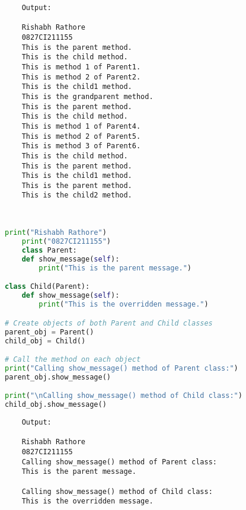 \documentclass{report}
\begin{document}
\begin{verbatim}
	Output:

	Rishabh Rathore
	0827CI211155
	This is the parent method.
	This is the child method.
	This is method 1 of Parent1.
	This is method 2 of Parent2.
	This is the child1 method.
	This is the grandparent method.
	This is the parent method.
	This is the child method.
	This is method 1 of Parent4.
	This is method 2 of Parent5.
	This is method 3 of Parent6.
	This is the child method.
	This is the parent method.
	This is the child1 method.
	This is the parent method.
	This is the child2 method.

	

\end{verbatim}

\newpage



\sol 
\begin{lstlisting}[language=Python]
	print("Rishabh Rathore")
	print("0827CI211155")
	class Parent:
    def show_message(self):
        print("This is the parent message.")

class Child(Parent):
    def show_message(self):
        print("This is the overridden message.")

# Create objects of both Parent and Child classes
parent_obj = Parent()
child_obj = Child()

# Call the method on each object
print("Calling show_message() method of Parent class:")
parent_obj.show_message()

print("\nCalling show_message() method of Child class:")
child_obj.show_message()

\end{lstlisting}

\begin{verbatim}
	Output:

	Rishabh Rathore
	0827CI211155
	Calling show_message() method of Parent class:
	This is the parent message.
	
	Calling show_message() method of Child class:
	This is the overridden message.

\end{verbatim}

\newpage
\end{document}
